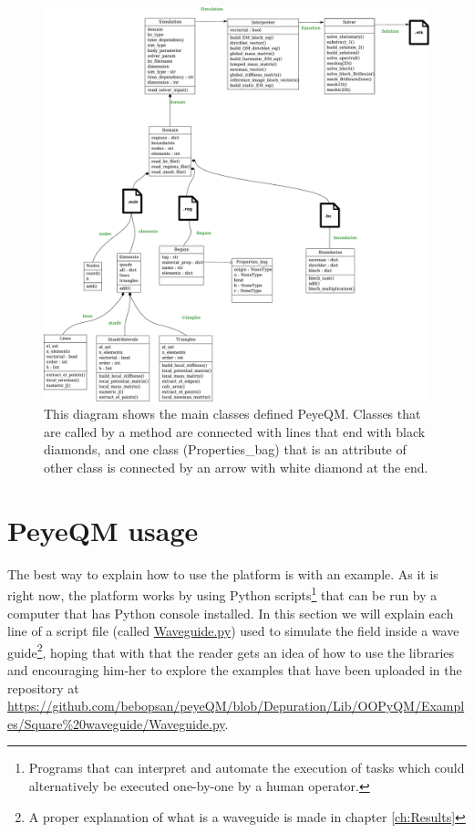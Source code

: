 \begin{figure}
\centering
\includegraphics[scale=0.35]{./img/class_diagram.pdf}
\caption{This diagram shows the main classes defined PeyeQM. Classes that are called by a method are connected with lines that end with black diamonds, and one class (Properties\_bag) that is an attribute of other class is connected by an arrow with white diamond at the end.}
\label{fig:classes}
\end{figure}

\section{PeyeQM usage}
The best way to explain how to use the platform is with an example. As it is right now, the platform works by using Python scripts\footnote{Programs that can interpret and automate the execution of tasks which could alternatively be executed one-by-one by a human operator.} that can be run by a computer that has Python console installed. In this section we will explain each line of a script  file (called \href{https://github.com/bebopsan/peyeQM/blob/Depuration/Lib/OOPyQM/Examples/Square\%20waveguide/Waveguide.py}{Waveguide.py}) used to simulate the field inside a wave guide\footnote{A proper explanation of what is a waveguide is made in chapter \ref{ch:Results}}, hoping that with that the reader gets an idea of how to use the libraries and encouraging him-her to explore the examples that have been uploaded in the repository at \url{https://github.com/bebopsan/peyeQM/blob/Depuration/Lib/OOPyQM/Examples/Square\%20waveguide/Waveguide.py}. 

